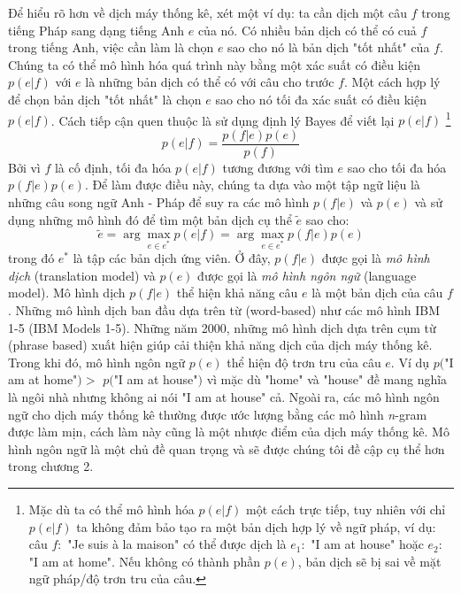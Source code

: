 Để hiểu rõ hơn về dịch máy thống kê, xét một ví dụ: ta cần dịch một câu $f$ trong tiếng Pháp sang dạng tiếng Anh $e$ của nó. Có nhiều bản dịch có thể có cuả $f$ trong tiếng Anh, việc cần làm là chọn $e$ sao cho nó là bản dịch "tốt nhất" của $f$. Chúng ta có thể mô hình hóa quá trình này bằng một xác suất có điều kiện $p(e|f)$ với $e$ là những bản dịch có thể có với câu cho trước $f$. Một cách hợp lý để chọn bản dịch "tốt nhất" là chọn $e$ sao cho nó tối đa xác suất có điều kiện $p(e|f)$. Cách tiếp cận quen thuộc là sử dụng định lý Bayes để viết lại $p(e|f)$ \footnote{Mặc dù ta có thể mô hình hóa $p(e|f)$ một cách trực tiếp, tuy nhiên với chỉ $p(e|f)$ ta không đảm bảo tạo ra một bản dịch hợp lý về ngữ pháp, ví dụ: câu $f:$ "Je suis à la maison" có thể được dịch là $e_1:$ "I am at house" hoặc $e_2:$ "I am at home". Nếu không có thành phần $p(e)$, bản dịch sẽ bị sai về mặt ngữ pháp/độ trơn tru của câu.}
\begin{equation} \label{bayesFomular}
	p(e|f) = \frac{p(f|e)p(e)}{p(f)}
\end{equation}
Bởi vì $f$ là cố định, tối đa hóa $p(e|f)$ tương đương với tìm $e$ sao cho tối đa hóa $p(f|e)p(e)$. Để làm được điều này, chúng ta dựa vào một tập ngữ liệu là những câu song ngữ Anh - Pháp để suy ra các mô hình $p(f|e)$ và $p(e)$ và sử dụng những mô hình đó để tìm một bản dịch cụ thể $\tilde{e}$ sao cho:
\begin{equation} \label{ehatSMT}
	\tilde{e} = \arg\max_{e \in e^*} p(e|f) = \arg\max_{e \in e^*} p(f|e)p(e)
\end{equation}
trong đó $e^*$ là tập các bản dịch ứng viên.
Ở đây, $p(f|e)$ được gọi là \textit{mô hình dịch} (translation model) và $p(e)$ được gọi là \textit{mô hình ngôn ngữ} (language model). Mô hình dịch $p(f|e)$ thể hiện khả năng câu $e$ là một bản dịch của câu $f$. Những mô hình dịch ban đầu dựa trên từ (word-based) như các mô hình IBM 1-5 (IBM Models 1-5). Những năm 2000, những mô hình dịch dựa trên cụm từ (phrase based) xuất hiện giúp cải thiện khả năng dịch của dịch máy thống kê. Trong khi đó, mô hình ngôn ngữ $p(e)$ thể hiện độ trơn tru của câu $e$. Ví dụ $p($"I am at home"$) >$ $p($"I am at house"$)$ vì mặc dù "home" và "house" đề mang nghĩa là ngôi nhà nhưng không ai nói "I am at house" cả. Ngoài ra, các mô hình ngôn ngữ cho dịch máy thống kê thường được ước lượng bằng các mô hình \textit{n}-gram được làm mịn, cách làm này cũng là một nhược điểm của dịch máy thống kê. Mô hình ngôn ngữ là một chủ đề quan trọng và sẽ được chúng tôi đề cập cụ thể hơn trong chương 2.

